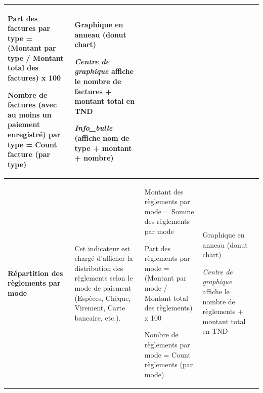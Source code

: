 \begin{longtable}{|>{\centering\arraybackslash\bfseries}p{2.5cm}|>{\raggedright\arraybackslash}p{3.5cm}|>{\raggedright\arraybackslash}p{4cm}|>{\centering\arraybackslash}p{1.8cm}|>{\centering\arraybackslash}p{1.5cm}|}
\vspace{4pt}
Part des factures par type = (Montant par type / Montant total des factures) x 100

\vspace{4pt}
Nombre de factures (avec au moins un paiement enregistré) par type = Count facture (par type) &
Graphique en anneau (donut chart)

\vspace{4pt}
\textit{Centre de graphique} affiche le nombre de factures + montant total en TND

\vspace{4pt}
\textit{Info\_bulle} (affiche nom de type + montant + nombre) &
{green!60!black} \\
\hline
Répartition des règlements par mode &
Cet indicateur est chargé d'afficher la distribution des règlements selon le mode de paiement (Espèces, Chèque, Virement, Carte bancaire, etc.). &
Montant des règlements par mode = Somme des règlements par mode

\vspace{4pt}
Part des règlements par mode = (Montant par mode / Montant total des règlements) x 100

\vspace{4pt}
Nombre de règlements par mode = Count règlements (par mode) &
Graphique en anneau (donut chart)

\vspace{4pt}
\textit{Centre de graphique} affiche le nombre de règlements + montant total en TND


\end{longtable}
